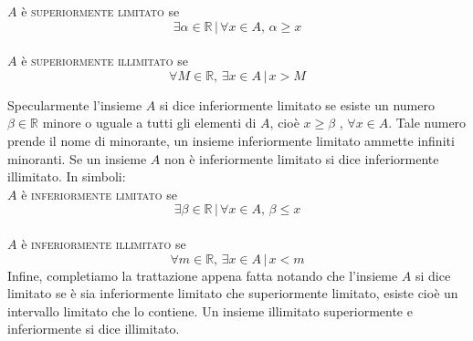 \(A\) è \textsc{superiormente limitato} se 
\begin{equation}
  \exists \alpha\in\mathbb{R}\, \vert\, \forall x \in A,\,\alpha\geq x
\end{equation}
\\

\(A\) è \textsc{superiormente illimitato} se 
\begin{equation}
  \forall M\in\mathbb{R},\, \exists x \in A\, \vert\,x> M
\end{equation}

Specularmente l'insieme \(A\) si dice inferiormente limitato se esiste un 
numero \(\beta\in \mathbb{R}\) minore o uguale a tutti gli elementi di \(A\), 
cioè \(x\geq\beta\) , \(\forall x\in A\). Tale numero prende il nome di 
minorante, un insieme inferiormente limitato ammette infiniti minoranti. Se 
un insieme \(A\) non è inferiormente limitato si dice inferiormente illimitato.
In simboli:\\

\(A\) è \textsc{inferiormente limitato} se 
\begin{equation}
  \exists \beta\in\mathbb{R}\, \vert\, \forall x \in A,\,\beta\leq x
\end{equation}
\\

\(A\) è \textsc{inferiormente illimitato} se 
\begin{equation}
  \forall m\in\mathbb{R},\, \exists x \in A\, \vert\,x< m
\end{equation}
Infine, completiamo la trattazione appena fatta notando che l'insieme \(A\) si 
dice limitato se è sia inferiormente limitato che superiormente limitato, 
esiste cioè un intervallo limitato che lo contiene. Un insieme illimitato 
superiormente e inferiormente si dice illimitato.\\

